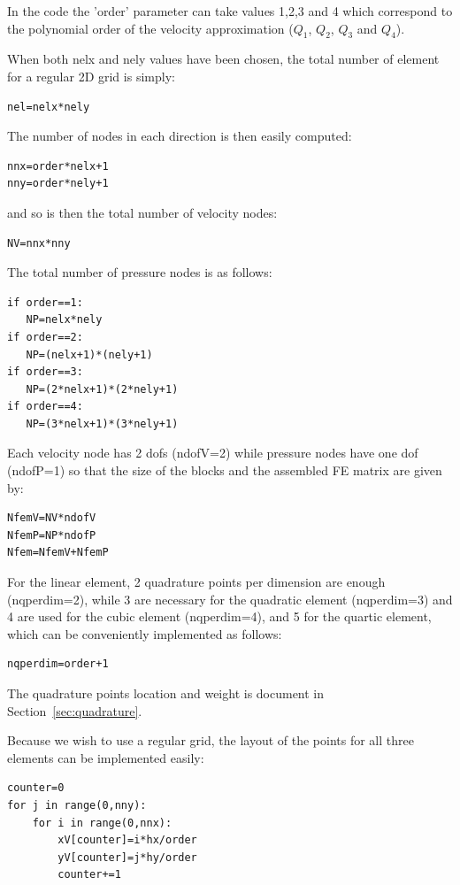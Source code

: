 In the code the 'order' parameter can take values 1,2,3 and 4 which 
correspond to the polynomial order of the velocity approximation ($Q_1$, $Q_2$, $Q_3$ and $Q_4$).

When both nelx and nely values have been chosen, the total number of element 
for a regular 2D grid is simply:
\begin{lstlisting}
nel=nelx*nely
\end{lstlisting}

The number of nodes in each direction is then easily computed:
\begin{lstlisting}
nnx=order*nelx+1 
nny=order*nely+1 
\end{lstlisting}
and so is then the total number of velocity nodes:
\begin{lstlisting}
NV=nnx*nny
\end{lstlisting}

The total number of pressure nodes is as follows:
\begin{lstlisting}
if order==1:
   NP=nelx*nely
if order==2:
   NP=(nelx+1)*(nely+1)
if order==3:
   NP=(2*nelx+1)*(2*nely+1)
if order==4:
   NP=(3*nelx+1)*(3*nely+1)
\end{lstlisting}

Each velocity node has 2 dofs (ndofV=2) while pressure nodes have one dof (ndofP=1) so that 
the size of the blocks and the assembled FE matrix are given by:

\begin{lstlisting}
NfemV=NV*ndofV      
NfemP=NP*ndofP    
Nfem=NfemV+NfemP
\end{lstlisting}

For the linear element, 2 quadrature points per dimension are enough (nqperdim=2), 
while 3 are necessary for the quadratic element (nqperdim=3) and 4 are used  
for the cubic element (nqperdim=4), and 5 for the quartic element,
which can be conveniently implemented as follows:
\begin{lstlisting}
nqperdim=order+1
\end{lstlisting}
The quadrature points location and weight is document in Section~\ref{sec:quadrature}.

Because we wish to use a regular grid, the layout of the points for all three elements 
can be implemented easily:

\begin{lstlisting}
counter=0    
for j in range(0,nny):
    for i in range(0,nnx):
        xV[counter]=i*hx/order
        yV[counter]=j*hy/order
        counter+=1
\end{lstlisting}

